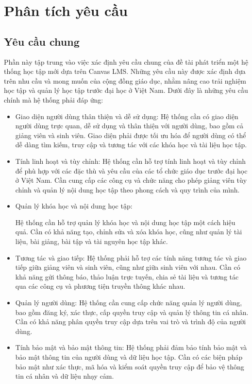 \documentclass[../Thesis.tex]{subfiles}
\begin{document}
\section{Phân tích yêu cầu}
    \subsection{Yêu cầu chung}
        Phần này tập trung vào việc xác định yêu cầu chung của đề tài phát triển một hệ thống học tập mới dựa trên Canvas LMS. Những yêu cầu này được xác định dựa trên nhu cầu và mong muốn của cộng đồng giáo dục, nhằm nâng cao trải nghiệm học tập và quản lý học tập trước đại học ở Việt Nam. Dưới đây là những yêu cầu chính mà hệ thống phải đáp ứng:
        \begin{itemize}
        
            \item Giao diện người dùng thân thiện và dễ sử dụng:
            Hệ thống cần có giao diện người dùng trực quan, dễ sử dụng và thân thiện với người dùng, bao gồm cả giảng viên và sinh viên.
            Giao diện phải được tối ưu hóa để người dùng có thể dễ dàng tìm kiếm, truy cập và tương tác với các khóa học và tài liệu học tập.
            
            \item Tính linh hoạt và tùy chỉnh:
            Hệ thống cần hỗ trợ tính linh hoạt và tùy chỉnh để phù hợp với các đặc thù và yêu cầu của các tổ chức giáo dục trước đại học ở Việt Nam.
            Cần cung cấp các công cụ và chức năng cho phép giảng viên tùy chỉnh và quản lý nội dung học tập theo phong cách và quy trình của mình.
            
            \item Quản lý khóa học và nội dung học tập:
            
            Hệ thống cần hỗ trợ quản lý khóa học và nội dung học tập một cách hiệu quả.
            Cần có khả năng tạo, chỉnh sửa và xóa khóa học, cũng như quản lý tài liệu, bài giảng, bài tập và tài nguyên học tập khác.
            
            \item Tương tác và giao tiếp:
            Hệ thống phải hỗ trợ các tính năng tương tác và giao tiếp giữa giảng viên và sinh viên, cũng như giữa sinh viên với nhau.
            Cần có khả năng gửi thông báo, thảo luận trực tuyến, chia sẻ tài liệu và tương tác qua các công cụ và phương tiện truyền thông khác nhau.
            
            \item Quản lý người dùng:
            Hệ thống cần cung cấp chức năng quản lý người dùng, bao gồm đăng ký, xác thực, cấp quyền truy cập và quản lý thông tin cá nhân.
            Cần có khả năng phân quyền truy cập dựa trên vai trò và trình độ của người dùng.
            
            \item Tính bảo mật và bảo mật thông tin:
            Hệ thống phải đảm bảo tính bảo mật và bảo mật thông tin của người dùng và dữ liệu học tập.
            Cần có các biện pháp bảo mật như xác thực, mã hóa và kiểm soát quyền truy cập để bảo vệ thông tin cá nhân và dữ liệu nhạy cảm.
        \end{itemize}
\end{document}
